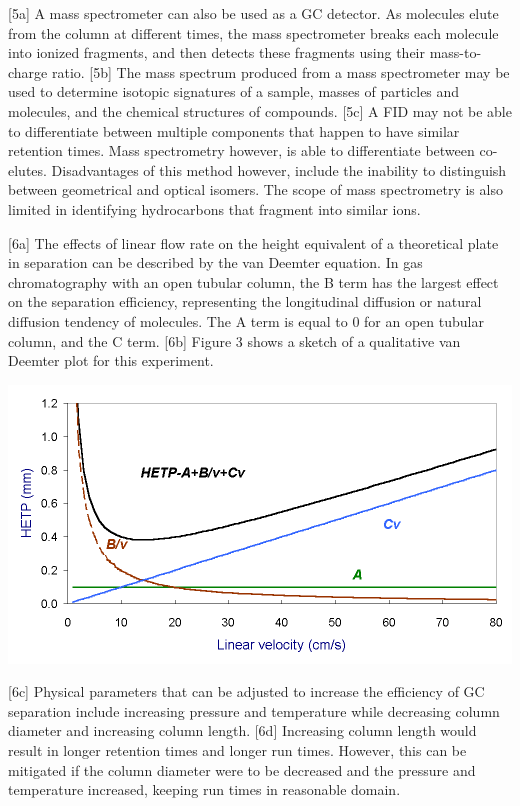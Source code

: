 \documentclass{article}
\begin{document}
\begin{multicols}{2}
{[5a] A mass spectrometer can also be used as a GC detector. As molecules elute
from the column at different times, the mass spectrometer breaks each molecule
into ionized fragments, and then detects these fragments using their
mass-to-charge ratio.
[5b] The mass spectrum produced from a mass spectrometer may be used to determine
isotopic signatures of a sample, masses of particles and molecules, and the
chemical structures of compounds.
[5c] A FID may not be able to differentiate between multiple components that
happen to have similar retention times. Mass spectrometry however, is able to
differentiate between co-elutes. Disadvantages of this method however, include
the inability to distinguish between geometrical and optical isomers. The scope
of mass spectrometry is also limited in identifying hydrocarbons that fragment
into similar ions.

[6a] The effects of linear flow rate on the height equivalent of a theoretical
plate in separation can be described by the van Deemter equation. In gas
chromatography with an open tubular column, the B term has the largest effect on
the separation efficiency, representing the longitudinal diffusion or natural
diffusion tendency of molecules. The A term is equal to 0 for an open tubular column,
and the C term.
[6b] Figure 3 shows a sketch of a qualitative van Deemter plot for this experiment.
\begin{center}
    \includegraphics[scale=0.2]{HETP.png}
\end{center}
[6c] Physical parameters that can be adjusted to increase the efficiency of GC
separation include increasing pressure and temperature while decreasing column
diameter and increasing column length.
[6d] Increasing column length would result in longer retention times and longer
run times. However, this can be mitigated if the column diameter were to be decreased and the pressure
and temperature increased, keeping run times in reasonable domain.

}
\end{multicols}
\end{document}
